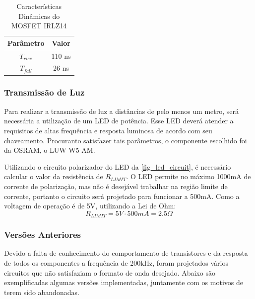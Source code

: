 	\begin{table}[ht]
		\caption{Características Dinâmicas do MOSFET IRLZ14}
		\centering
		\begin{tabular}{c c}
			\hline
			Parâmetro  & Valor  \\ \hline
			$T_{rise}$ & 110 ns \\
			$T_{fall}$ & 26 ns  \\ \hline
		\end{tabular}
		\label{tab_irlz14_timing}
	\end{table}

	\subsubsection{Transmissão de Luz}
		
	Para realizar a transmissão de luz a distâncias de pelo menos um metro, será necessária a utilização de um LED de potência. Esse LED deverá atender a requisitos de altas frequência e resposta luminosa de acordo com seu chaveamento. Procuranto satisfazer tais parâmetros, o componente escolhido foi da OSRAM, o LUW W5-AM.

	Utilizando o circuito polarizador do LED da \autoref{fig_led_circuit}, é necessário calcular o valor da resistência de $R_{LIMIT}$. O LED permite no máximo 1000mA de corrente de polarização, mas não é desejável trabalhar na região limite de corrente, portanto o circuito será projetado para funcionar a 500mA. Como a voltagem de operação é de 5V, utilizando a Lei de Ohm:
	\begin{equation}
	R_{LIMIT} = 5V \cdot 500mA = 2.5\Omega
	\end{equation}
	
	\subsubsection{Versões Anteriores}
	
	Devido a falta de conhecimento do comportamento de transistores e da resposta de todos os componentes a frequência de 200kHz, foram projetados vários circuitos que não satisfaziam o formato de onda desejado. Abaixo são exemplificadas algumas versões implementadas, juntamente com os motivos de terem sido abandonadas.
	
